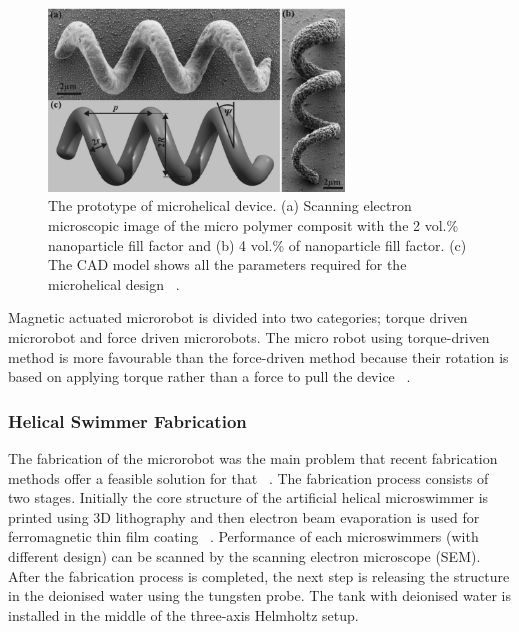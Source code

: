 \documentclass[a4paper,11pt]{article}
\begin{document}
\begin{sloppypar}
\begin{figure}
  \centering
    \includegraphics[width=0.7\textwidth]{8}
  \caption{ The prototype of microhelical device. (a) Scanning electron microscopic image of the micro polymer composit
with the 2 vol.\% nanoparticle fill factor and (b) 4 vol.\% of nanoparticle fill factor. (c) The CAD model
shows all the parameters required for the microhelical design ~\citep{peyer2013bacteria}.}
  \label{ref8}
\end{figure}

Magnetic actuated microrobot is divided into two categories; torque driven microrobot and force
 driven microrobots.
The micro robot using torque-driven method is more favourable than the force-driven method 
because their rotation is based on applying torque rather than a force to pull the device ~\citep{peyer2013bacteria}.

\paragraph{} 
\subsubsection{Helical Swimmer Fabrication}
The fabrication of the microrobot was the main problem that recent fabrication methods 
offer a feasible solution for that ~\citep{gao2013bioinspired}. 
The fabrication process consists of two stages. Initially the core structure of the artificial helical 
microswimmer is printed using 3D lithography and then electron beam evaporation is used for 
ferromagnetic thin film coating ~\citep{tottori2013artificial}.  
Performance of each microswimmers (with different design) can be scanned by the scanning electron
 microscope (SEM). After the fabrication process is completed, the next step is releasing the structure in 
the deionised water using the tungsten probe. The tank with deionised water is installed in the middle of the 
three-axis Helmholtz setup. 


\end{sloppypar}
\end{document}
